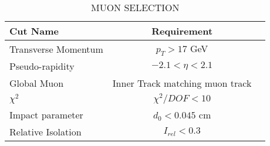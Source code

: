\begin{table}[tpb]
  \setlength{\capwidth}{0.9\textwidth}
  \begin{small}
  \begin{center}
    \caption{MUON SELECTION}
    \label{tab:muonselection}
    \begin{tabular}{lcc}
      \toprule
      Cut Name & Requirement \\
      \midrule
      Transverse Momentum & $p_{T} > 17$ GeV \\
      Pseudo-rapidity & $-2.1 < \eta < 2.1$ \\
      Global Muon & Inner Track matching muon track \\
      $\chi^{2}$ & $\chi^{2}/DOF < 10$ \\
      Impact parameter & $d_{0} < 0.045$ cm \\
      Relative Isolation & $I_{rel} < 0.3$ \\
      \bottomrule
    \end{tabular}
  \end{center}
  \end{small}
\end{table}


